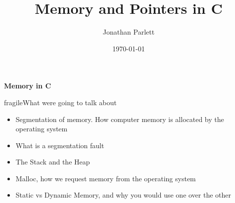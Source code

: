 \documentclass{beamer}
\title{Memory and Pointers in C}
\author{Jonathan Parlett}
\date{\today}
\begin{document}
\begin{frame}
    \titlepage
	{\bf Memory in C}
\end{frame}

\begin{frame}{fragile}{What were going to talk about}
	\begin{itemize}[<+->]
		\item Segmentation of memory. How computer memory is allocated by the operating system
		\item What is a segmentation fault
		\item The Stack and the Heap
		\item Malloc, how we request memory from the operating system
		\item Static vs Dynamic Memory, and why you would use one over the other
	\end{itemize}
\end{frame}
\end{document}
